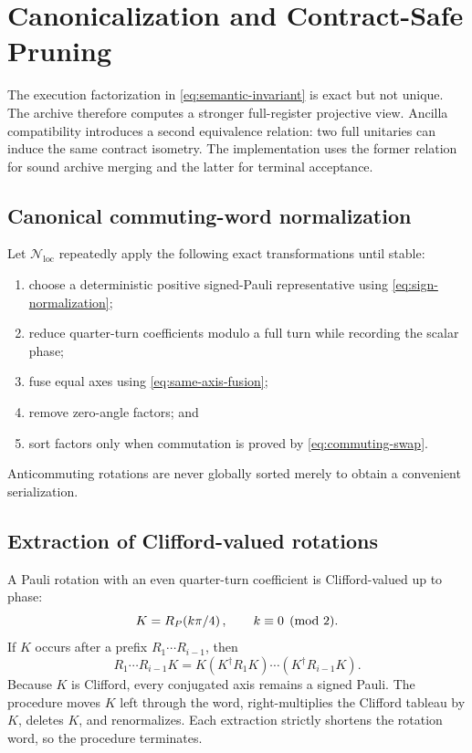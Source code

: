 \section{Canonicalization and Contract-Safe Pruning}
\label{sec:canonicalization}

The execution factorization in \eqref{eq:semantic-invariant} is exact but not unique. The archive therefore computes a stronger full-register projective view. Ancilla compatibility introduces a second equivalence relation: two full unitaries can induce the same contract isometry. The implementation uses the former relation for sound archive merging and the latter for terminal acceptance.

\subsection{Canonical commuting-word normalization}

Let $\mathcal N_{\mathrm{loc}}$ repeatedly apply the following exact transformations until stable:
\begin{enumerate}
\item choose a deterministic positive signed-Pauli representative using \eqref{eq:sign-normalization};
\item reduce quarter-turn coefficients modulo a full turn while recording the scalar phase;
\item fuse equal axes using \eqref{eq:same-axis-fusion};
\item remove zero-angle factors; and
\item sort factors only when commutation is proved by \eqref{eq:commuting-swap}.
\end{enumerate}
Anticommuting rotations are never globally sorted merely to obtain a convenient serialization.

\subsection{Extraction of Clifford-valued rotations}

A Pauli rotation with an even quarter-turn coefficient is Clifford-valued up to phase:
\begin{equation}
K=R_{P}\!\left(k\pi/4\right),
\qquad k\equiv0\pmod2.
\label{eq:clifford-valued}
\end{equation}
If $K$ occurs after a prefix $R_1\cdots R_{i-1}$, then
\begin{equation}
R_1\cdots R_{i-1}K
=K(K^\dagger R_1K)\cdots(K^\dagger R_{i-1}K).
\label{eq:extract-identity}
\end{equation}
Because $K$ is Clifford, every conjugated axis remains a signed Pauli. The procedure moves $K$ left through the word, right-multiplies the Clifford tableau by $K$, deletes $K$, and renormalizes. Each extraction strictly shortens the rotation word, so the procedure terminates.

